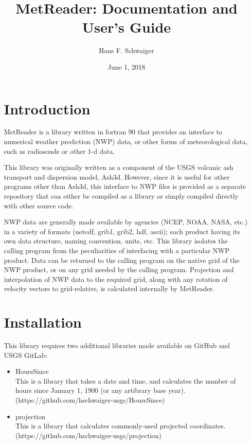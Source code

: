 \documentclass[11pt]{article}   %
\begin{document}
\title{MetReader: Documentation and User's Guide}   %
\author{Hans F. Schwaiger}
\date{June 1, 2018}    %
\maketitle

\section{Introduction}
MetReader is a library written in fortran 90 that provides an interface to
numerical weather prediction (NWP) data, or other forms of meteorological
data, such as radiosonde or other 1-d data.

This library was originally written as a component of the USGS volcanic ash
transport and dispersion model, Ash3d.  However, since it is useful for
other programs other than Ash3d, this interface to NWP files is provided
as a separate repository that can either be compiled as a library or simply
compiled directly with other source code.

NWP data are generally made available by agencies (NCEP, NOAA, NASA, etc.)
in a variety of formats (netcdf, grib1, grib2, hdf, ascii); each product having
its own data structure, naming convention, units, etc.  This library
isolates the calling program from the peculiarities of interfacing with
a particular NWP product.  Data can be returned to the calling program on
the native grid of the NWP product, or on any grid needed by the calling
program.  Projection and interpolation of NWP data to the required grid, along
with any rotation of velocity vectors to grid-relative, is calculated internally by
MetReader.

\section{Installation}
This library requires two additional libraries made available on GitHub and USGS GitLab:
\begin{itemize}
\item HoursSince \\
This is a library that takes a date and time, and calculates the number of hours
since January 1, 1900 (or any artibrary base year).\\
(https://github.com/hschwaiger-usgs/HoursSince)
\item projection \\
This is a library that calculates commonly-used projected coordinates.\\
(https://github.com/hschwaiger-usgs/projection)
\end{itemize}
\end{document}
